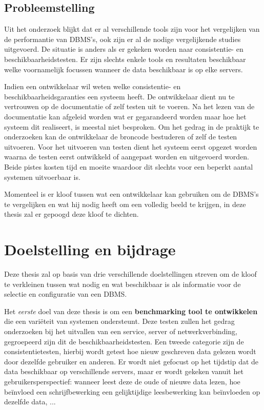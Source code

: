 \subsection{Probleemstelling}
Uit het onderzoek blijkt dat er al verschillende tools zijn voor het vergelijken van de performantie van DBMS's, ook zijn er al de nodige vergelijkende studies uitgevoerd. De situatie is anders als er gekeken worden naar consistentie- en beschikbaarheidstesten. Er zijn slechts enkele tools en resultaten beschikbaar welke voornamelijk focussen wanneer de data beschikbaar is op elke servers. 

Indien een ontwikkelaar wil weten welke consistentie- en beschikbaarheidsgaranties een systeem heeft. De ontwikkelaar dient nu te vertrouwen op de documentatie of zelf testen uit te voeren. Na het lezen van de documentatie kan afgeleid worden wat er gegarandeerd worden maar hoe het systeem dit realiseert, is meestal niet besproken. Om het gedrag in de praktijk te onderzoeken kan de ontwikkelaar de broncode bestuderen of zelf de testen uitvoeren. Voor het uitvoeren van testen dient het systeem eerst opgezet worden waarna de testen eerst ontwikkeld of aangepast worden en uitgevoerd worden. Beide pistes kosten tijd en moeite waardoor dit slechts voor een beperkt aantal systemen uitvoerbaar is. 

Momenteel is er kloof tussen wat een ontwikkelaar kan gebruiken om de DBMS's te vergelijken en wat hij nodig heeft om een volledig beeld te krijgen, in deze thesis zal er gepoogd deze kloof te dichten. 

\section{Doelstelling en bijdrage}
Deze thesis zal op basis van drie verschillende doelstellingen streven om de kloof te verkleinen tussen wat nodig en wat beschikbaar is als informatie voor de selectie en configuratie van een DBMS. 

Het \textit{eerste} doel van deze thesis is om een \textbf{benchmarking tool te ontwikkelen} die een variëteit van systemen ondersteunt. Deze testen zullen het gedrag onderzoeken bij het uitvallen van een service, server of netwerkverbinding, gegroepeerd zijn dit de beschikbaarheidstesten. Een tweede categorie zijn de consistentietesten, hierbij wordt getest hoe nieuw geschreven data gelezen wordt door dezelfde gebruiker en anderen. Er wordt niet gefocust op het tijdstip dat de data beschikbaar op verschillende servers, maar er wordt gekeken vanuit het gebruikersperspectief: wanneer leest deze de oude of nieuwe data lezen, hoe beïnvloed een schrijfbewerking een gelijktijdige leesbewerking kan beïnvloeden op dezelfde data, ... \\

